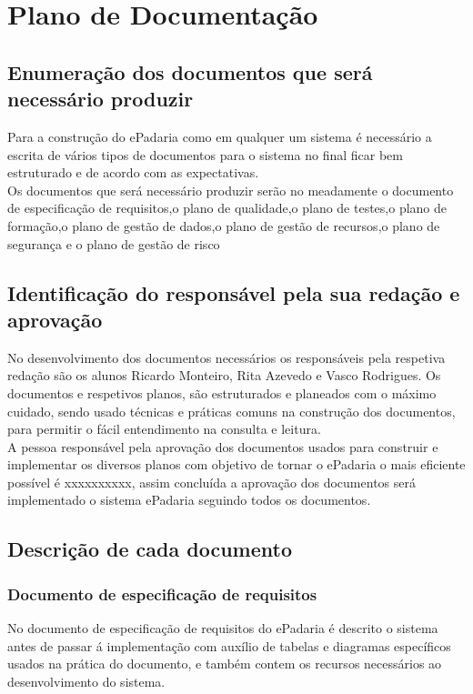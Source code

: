 \chapter{Plano de Documentação}
\label{plano_de_documentacao}

\section{Enumeração dos documentos que será necessário produzir}
Para a construção do ePadaria como em qualquer um sistema é necessário a escrita de vários tipos de documentos para o sistema no final ficar bem estruturado e de acordo com as expectativas.\\
Os documentos que será necessário produzir serão no
meadamente o documento de especificação de requisitos,o plano de qualidade,o plano de testes,o plano de formação,o plano de gestão de dados,o plano de gestão de recursos,o plano de segurança e o plano de gestão de risco
\section{Identificação do responsável pela sua redação e aprovação}
No desenvolvimento dos documentos necessários os responsáveis pela respetiva redação são os alunos Ricardo Monteiro, Rita Azevedo e Vasco Rodrigues. Os documentos e respetivos planos, são estruturados e planeados com o máximo cuidado, sendo usado técnicas e práticas comuns na construção dos documentos, para permitir o fácil entendimento na consulta e leitura.\\
A pessoa responsável pela aprovação dos documentos usados para construir e implementar os diversos planos com objetivo de tornar o ePadaria o mais eficiente possível é xxxxxxxxxx, assim concluída a aprovação dos documentos será implementado o sistema ePadaria seguindo todos os documentos.


\section{Descrição de cada documento}
\subsection{Documento de especificação de requisitos}
No documento de especificação de requisitos do ePadaria é descrito o sistema antes de passar á implementação com auxílio de tabelas e diagramas específicos usados na prática do documento, e também contem os recursos necessários ao desenvolvimento do sistema. 
